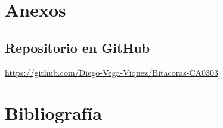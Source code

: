 \documentclass[
  11pt,
  oneside]{article}
\begin{document}
\newpage{}

\section{Anexos}\label{anexos}

\subsection{Repositorio en GitHub}\label{repositorio-en-github}

\url{https://github.com/Diego-Vega-Viquez/Bitacoras-CA0303}

\section*{Bibliografía}\label{bibliografuxeda}
\end{document}
